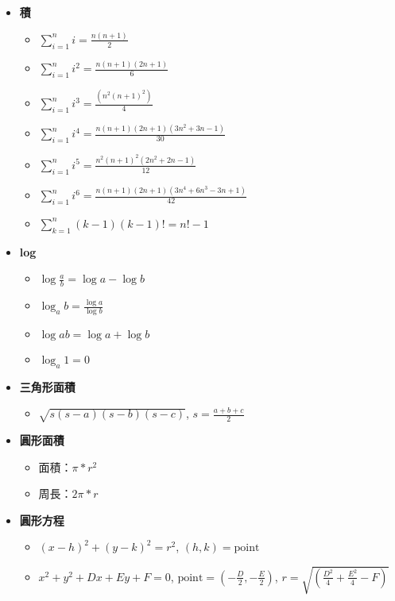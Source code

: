 \usepackage{amsmath}

\begin{itemize}
  \item \textbf{積}
  \begin{itemize}
    \item $\sum \limits_{i=1}^n i = \frac{n(n+1)}{2}$
    \item $\sum \limits_{i=1}^n i^2 = \frac{n(n+1)(2n+1)}{6}$
    \item $\sum \limits_{i=1}^n i^3 = \frac{(n^2(n+1)^2)}{4}$
    \item $\sum \limits_{i=1}^n i^4 = \frac{n(n+1)(2n+1)(3n^2+3n-1)}{30}$
    \item $\sum \limits_{i=1}^n i^5 = \frac{n^2(n+1)^2(2n^2+2n-1)}{12}$
    \item $\sum \limits_{i=1}^n i^6 = \frac{n(n+1)(2n+1)(3n^4+6n^3-3n+1)}{42}$
    \item $\sum \limits_{k=1}^n (k-1)(k-1)! = n!-1$
  \end{itemize}
  
  \item \textbf{log}
  \begin{itemize}
    \item $\log\frac{a}{b} = \log a - \log b$
    \item $\log_a b = \frac{\log a}{\log b}$
    \item $\log ab = \log a + \log b$
    \item $\log_a 1 = 0$
  \end{itemize}
  
  \item \textbf{三角形面積}
  \begin{itemize}
    \item $\sqrt{s(s-a)(s-b)(s-c)}$, $s = \frac{a+b+c}{2}$
  \end{itemize}

  \item \textbf{圓形面積}
  \begin{itemize}
    \item 面積：$\pi *r^2$
    \item 周長：$2\pi *r$
  \end{itemize}

  \item \textbf{圓形方程}
  \begin{itemize}
    \item $(x-h)^2+(y-k)^2 = r^2$, $(h, k) = \text{point}$
    \item $x^2 + y^2 + Dx + Ey + F = 0$, $\text{point}=\left(-\frac{D}{2}, -\frac{E}{2}\right)$, $r = \sqrt{\left(\frac{D^2}{4}+\frac{E^2}{4}-F\right)}$
  \end{itemize}


\end{itemize}
